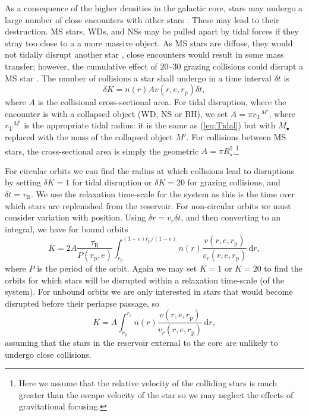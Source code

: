 \documentclass[useAMS,usedcolumn,usegraphicx,usenatbib]{mn2e}
\newcommand{\eqnref}[1]{(\ref{eq:#1})}
\newcommand{\sub}[1]{\ensuremath{_\mathrm{#1}}}
\newcommand{\dd}{\ensuremath{\mathrm{d}}}
\newcommand{\intd}[4]{\ensuremath{\displaystyle \int_{#1}^{#2}{#3}\,\dd{#4}}}
\begin{document}
As a consequence of the higher densities in the galactic core, stars may undergo a large number of close encounters with other stars \citep{Cohn1978}. These may lead to their destruction. MS stars, WDs, and NSs may be pulled apart by tidal forces if they stray too close to a a more massive object. As MS stars are diffuse, they would not tidally disrupt another star \citep{Murphy1991,Freitag2005}, close encounters would result in some mass transfer; however, the cumulative effect of $20$--$30$ grazing collisions could disrupt a MS star \citep{Freitag2006}. The number of collisions a star shall undergo in a time interval $\delta t$ is
\begin{equation}
\delta K = n(r) A v(r,e,r\sub{p})\delta t,
\end{equation}
where $A$ is the collisional cross-sectional area. For tidal disruption, where the encounter is with a collapsed object (WD, NS or BH), we set $A = \pi r\sub{T}^{M'}$, where $r\sub{T}^{M'}$ is the appropriate tidal radius: it is the same as \eqnref{Tidal} but with $M_\bullet$ replaced with the mass of the collapsed object $M'$. For collisions between MS stars, the cross-sectional area is simply the geometric $A = \pi R_\star^2$.\footnote{Here we assume that the relative velocity of the colliding stars is much greater than the escape velocity of the star so we may neglect the effects of gravitational focusing.}

For circular orbits we can find the radius at which collisions lead to disruptions by setting $\delta K = 1$ for tidal disruption or $\delta K = 20$ for grazing collisions, and $\delta t = \tau\sub{R}$. We use the relaxation time-scale for the system as this is the time over which stars are replenished from the reservoir. For non-circular orbits we must consider variation with position. Using $\delta r = v_r \delta t$, and then converting to an integral, we have for bound orbits
\begin{equation}
K = 2 A \frac{\tau\sub{R}}{P(r\sub{p},e)}\intd{r\sub{p}}{(1+e)r\sub{p}/(1-e)}{n(r)\frac{v(r,e,r\sub{p})}{v_r(r,e,r\sub{p})}}{r},
\end{equation}
where $P$ is the period of the orbit. Again we may set $K = 1$ or $K = 20$ to find the orbits for which stars will be disrupted within a relaxation time-scale (of the system). For unbound orbits we are only interested in stars that would become disrupted before their periapse passage, so
\begin{equation}
K = A \intd{r\sub{p}}{r\sub{c}}{n(r)\frac{v(r,e,r\sub{p})}{v_r(r,e,r\sub{p})}}{r},
\end{equation}
assuming that the stars in the reservoir external to the core are unlikely to undergo close collisions.
\end{document}
